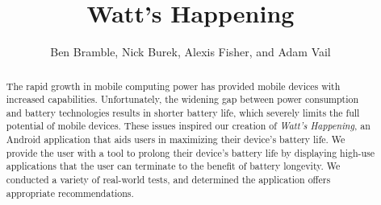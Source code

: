 \documentclass[11pt,pdftex,twocolumn]{article}
\title{Watt's Happening}
\author{Ben Bramble, Nick Burek, Alexis Fisher, and Adam Vail}
\begin{document}
\maketitle

\begin{abstract}
The rapid growth in mobile computing power has provided mobile devices with increased capabilities. 
Unfortunately, the widening gap between power consumption and battery technologies
results in shorter battery life, which severely limits the full potential of mobile devices.
These issues inspired our creation of \emph{Watt's Happening}, an Android application that aids users in maximizing their device's battery life.
We provide the user with a tool to prolong their device's battery life by displaying high-use applications that the user can terminate to the benefit of battery longevity.
We conducted a variety of real-world tests, and determined the application offers appropriate recommendations.

\end{abstract}









{\footnotesize 
}
\end{document}
